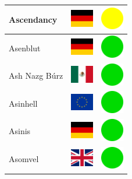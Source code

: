 \documentclass[12pt, a4paper, twoside]{report}
\begin{document}
\begin{center}
\begin{longtable}{|p{5cm}|p{2cm}|p{2cm}|}
 Ascendancy                                                 & \includegraphics[width=1cm]{../img/flags/de} &   \includegraphics[width=1cm]{../likes/m} \\ \hline
 Asenblut                                                   & \includegraphics[width=1cm]{../img/flags/de} &   \includegraphics[width=1cm]{../likes/y} \\ \hline
 Ash Nazg Búrz                                              & \includegraphics[width=1cm]{../img/flags/mx} &   \includegraphics[width=1cm]{../likes/y} \\ \hline
 Asinhell                                                   & \includegraphics[width=1cm]{../img/flags/eu} &   \includegraphics[width=1cm]{../likes/y} \\ \hline
 Asinis                                                     & \includegraphics[width=1cm]{../img/flags/de} &   \includegraphics[width=1cm]{../likes/y} \\ \hline
 Asomvel                                                    & \includegraphics[width=1cm]{../img/flags/gb} &   \includegraphics[width=1cm]{../likes/y} \\ \hline

\end{longtable}
\end{center}
\end{document}
